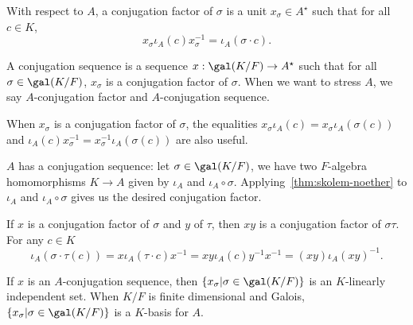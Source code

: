 \begin{definition}
  \label{def:conj-factor}
  With respect to $A$, a conjugation factor of $\sigma$ is a unit $x_{\sigma} \in A^{\star}$ such that for all $c \in K$,
  \[
    x_{\sigma} \iota_{A}(c)x_{\sigma}^{-1} = \iota_{A}(\sigma \cdot c).
  \]

  A conjugation sequence is a sequence $x:\gal(K/F) \to A^{\star}$ such that for all $\sigma\in\gal(K/F)$, $x_{\sigma}$ is a conjugation factor of $\sigma$. When we want to stress $A$, we say $A$-conjugation factor and $A$-conjugation sequence.
  \leanok
\end{definition}

\begin{remark}\label{rem:conj-factor-alternative-eq}
  When $x_{\sigma}$ is a conjugation factor of $\sigma$, the equalities $x_{\sigma}\iota_{A}(c) = x_{\sigma}\iota_{A}(\sigma(c))$ and $\iota_{A}(c)x_{\sigma}^{-1}=x_{\sigma}^{-1}\iota_{A}(\sigma(c))$ are also useful.
\end{remark}

\begin{construction}\label{con:exists-conj-seq}
  $A$ has a conjugation sequence:
  let $\sigma \in \gal(K/F)$, we have two $F$-algebra homomorphisms $K \to A$ given by $\iota_{A}$ and $\iota_{A}\circ \sigma$. Applying~\cref{thm:skolem-noether} to $\iota_{A}$ and $\iota_{A}\circ \sigma$ gives us the desired conjugation factor.
  \leanok
\end{construction}

\begin{construction}
  If $x$ is a conjugation factor of $\sigma$ and $y$ of $\tau$, then $xy$ is a conjugation factor of $\sigma\tau$. For any $c \in K$
  \[
    \iota_{A}(\sigma \cdot\tau(c)) = x\iota_{A}(\tau\cdot c)x^{-1} = xy\iota_{A}(c)y^{-1}x^{-1}=\left(xy\right)\iota_{A}{\left(xy\right)}^{-1}.
  \]
  \leanok
\end{construction}

\begin{theorem}\label{thm:conj-seq-basis}
  If $x$ is an $A$-conjugation sequence, then $\{x_{\sigma}|\sigma\in \gal(K/F)\}$ is an $K$-linearly independent set. When $K/F$ is finite dimensional and Galois, $\{x_{\sigma}|\sigma\in \gal(K/F)\}$ is a $K$-basis for $A$.
  \leanok
\end{theorem}


